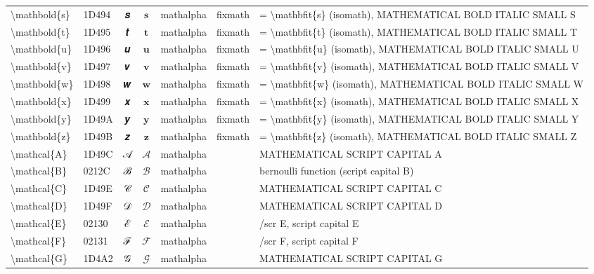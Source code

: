 \documentclass[a4paper,landscape]{article}
\begin{document}
\begin{longtable}{llcclll}
\textbackslash{}mathbold\{s\} & 1D494 & 𝒔 & $\mathbold{s}$ & mathalpha & fixmath & = \textbackslash{}mathbfit\{s\} (isomath),  MATHEMATICAL BOLD ITALIC SMALL S \\
\textbackslash{}mathbold\{t\} & 1D495 & 𝒕 & $\mathbold{t}$ & mathalpha & fixmath & = \textbackslash{}mathbfit\{t\} (isomath),  MATHEMATICAL BOLD ITALIC SMALL T \\
\textbackslash{}mathbold\{u\} & 1D496 & 𝒖 & $\mathbold{u}$ & mathalpha & fixmath & = \textbackslash{}mathbfit\{u\} (isomath),  MATHEMATICAL BOLD ITALIC SMALL U \\
\textbackslash{}mathbold\{v\} & 1D497 & 𝒗 & $\mathbold{v}$ & mathalpha & fixmath & = \textbackslash{}mathbfit\{v\} (isomath),  MATHEMATICAL BOLD ITALIC SMALL V \\
\textbackslash{}mathbold\{w\} & 1D498 & 𝒘 & $\mathbold{w}$ & mathalpha & fixmath & = \textbackslash{}mathbfit\{w\} (isomath),  MATHEMATICAL BOLD ITALIC SMALL W \\
\textbackslash{}mathbold\{x\} & 1D499 & 𝒙 & $\mathbold{x}$ & mathalpha & fixmath & = \textbackslash{}mathbfit\{x\} (isomath),  MATHEMATICAL BOLD ITALIC SMALL X \\
\textbackslash{}mathbold\{y\} & 1D49A & 𝒚 & $\mathbold{y}$ & mathalpha & fixmath & = \textbackslash{}mathbfit\{y\} (isomath),  MATHEMATICAL BOLD ITALIC SMALL Y \\
\textbackslash{}mathbold\{z\} & 1D49B & 𝒛 & $\mathbold{z}$ & mathalpha & fixmath & = \textbackslash{}mathbfit\{z\} (isomath),  MATHEMATICAL BOLD ITALIC SMALL Z \\
\textbackslash{}mathcal\{A\} & 1D49C & 𝒜 & $\mathcal{A}$ & mathalpha &  & MATHEMATICAL SCRIPT CAPITAL A \\
\textbackslash{}mathcal\{B\} & 0212C & ℬ & $\mathcal{B}$ & mathalpha &  & bernoulli function (script capital B) \\
\textbackslash{}mathcal\{C\} & 1D49E & 𝒞 & $\mathcal{C}$ & mathalpha &  & MATHEMATICAL SCRIPT CAPITAL C \\
\textbackslash{}mathcal\{D\} & 1D49F & 𝒟 & $\mathcal{D}$ & mathalpha &  & MATHEMATICAL SCRIPT CAPITAL D \\
\textbackslash{}mathcal\{E\} & 02130 & ℰ & $\mathcal{E}$ & mathalpha &  & /scr E, script capital E \\
\textbackslash{}mathcal\{F\} & 02131 & ℱ & $\mathcal{F}$ & mathalpha &  & /scr F, script capital F \\
\textbackslash{}mathcal\{G\} & 1D4A2 & 𝒢 & $\mathcal{G}$ & mathalpha &  & MATHEMATICAL SCRIPT CAPITAL G \\

\end{longtable}
\end{document}
